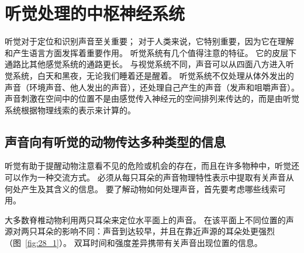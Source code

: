 \chapter{听觉处理的中枢神经系统} \label{chap:chap28}

听觉对于定位和识别声音至关重要；
对于人类来说，它特别重要，因为它在理解和产生语言方面发挥着重要作用。
听觉系统有几个值得注意的特征。
它的皮层下通路比其他感觉系统的通路更长。
与视觉系统不同，声音可以从四面八方进入听觉系统，白天和黑夜，无论我们睡着还是醒着。
听觉系统不仅处理从体外发出的声音（环境声音、他人发出的声音），还处理自己产生的声音（发声和咀嚼声音）。
声音刺激在空间中的位置不是由感觉传入神经元的空间排列来传达的，而是由听觉系统根据物理线索的表示来计算的。



\section{声音向有听觉的动物传达多种类型的信息}

听觉有助于提醒动物注意看不见的危险或机会的存在，而且在许多物种中，听觉还可以作为一种交流方式。
必须从每只耳朵的声音物理特性表示中提取有关声音从何处产生及其含义的信息。
要了解动物如何处理声音，首先要考虑哪些线索可用。


大多数脊椎动物利用两只耳朵来定位水平面上的声音。
在该平面上不同位置的声源对两只耳朵的影响不同：声音到达较早，并且在靠近声源的耳朵处更强烈（图~\ref{fig:28_1}）。
双耳时间和强度差异携带有关声音出现位置的信息。



